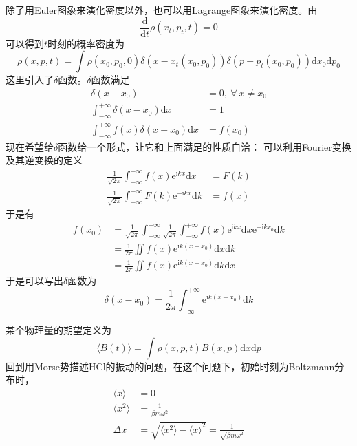 \documentclass[12pt]{article}
\begin{document}
除了用Euler图象来演化密度以外，也可以用Lagrange图象来演化密度。由
\begin{equation*}
    \frac {\mathrm{d}}{\mathrm{d}t} \rho(x_t,p_t,t) = 0
\end{equation*}
可以得到$t$时刻的概率密度为
\begin{equation*}
    \rho(x,p,t) = \int \rho(x_0,p_0,0)\delta(x-x_t(x_0,p_0)) \delta(p-p_t(x_0,p_0)) \mathrm{d}x_0\mathrm{d}p_0
\end{equation*}
这里引入了$\delta$函数。$\delta$函数满足
\begin{align*}
    \delta(x-x_0) &= 0, \ \forall \ x \neq x_0\\
    \int_{-\infty}^{+\infty} \delta(x-x_0) \mathrm{d}x &= 1\\
    \int_{-\infty}^{+\infty} f(x)\delta(x-x_0) \mathrm{d}x &= f(x_0)
\end{align*}
现在希望给$\delta$函数给一个形式，让它和上面满足的性质自洽：
可以利用Fourier变换及其逆变换的定义
\begin{align*}
    \frac 1{\sqrt{2\pi}} \int_{-\infty}^{+\infty} f(x)\mathrm{e}^{\mathrm{i}kx}\mathrm{d}x &= F(k)\\
    \frac 1{\sqrt{2\pi}} \int_{-\infty}^{+\infty} F(k)\mathrm{e}^{-\mathrm{i}kx}\mathrm{d}k &= f(x)
\end{align*}
于是有
\begin{align*}
    f(x_0) &= \frac 1{\sqrt{2\pi}} \int_{-\infty}^{+\infty} \frac 1{\sqrt{2\pi}} \int_{-\infty}^{+\infty} f(x)\mathrm{e}^{\mathrm{i}kx}\mathrm{d}x \mathrm{e}^{-\mathrm{i}kx_0}\mathrm{d}k\\
    &= \frac 1{2\pi} \iint f(x)\mathrm{e}^{\mathrm{i}k(x-x_0)}\mathrm{d}x\mathrm{d}k\\
    &= \frac 1{2\pi} \iint f(x)\mathrm{e}^{\mathrm{i}k(x-x_0)}\mathrm{d}k\mathrm{d}x
\end{align*}
于是可以写出$\delta$函数为
\begin{equation*}
    \delta(x-x_0) = \frac 1{2\pi} \int_{-\infty}^{+\infty} \mathrm{e}^{\mathrm{i}k(x-x_0)}\mathrm{d}k
\end{equation*}

某个物理量的期望定义为
\begin{equation*}
    \langle B(t) \rangle = \int \rho(x,p,t) B(x,p) \mathrm{d}x\mathrm{d}p
\end{equation*}
回到用Morse势描述HCl的振动的问题，在这个问题下，初始时刻为Boltzmann分布时，
\begin{align*}
    \langle x \rangle &= 0\\
    \langle x^2 \rangle &= \frac 1{\beta m \omega^2}\\
    \Delta x &= \sqrt{\langle x^2 \rangle - \langle x \rangle ^2} = \frac 1{\sqrt{\beta m \omega^2}}
\end{align*}
\end{document}

